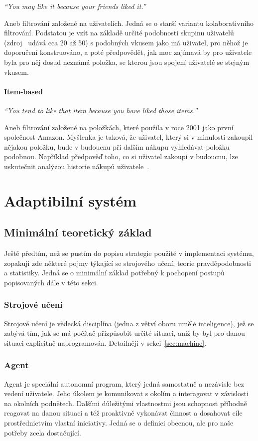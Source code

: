 \documentclass[thesis=M,czech]{FITthesis}[2014/05/07]
\begin{document}
\emph{``You may like it because your friends liked it.''}~\cite{cf}

Aneb filtrování založené na uživatelích. Jedná se o starší variantu kolaborativního filtrování. Podstatou je vzít na základě určité podobnosti skupinu uživatelů (zdroj~\cite{cf} udává cca 20 až 50) s podobných vkusem jako má uživatel, pro něhož je doporučení konstruováno, a poté předpovědět, jak moc zajímavá by pro uživatele byla pro něj dosud neznámá položka, se kterou jsou spojení uživatelé se stejným vkusem.

\subsubsection{Item-based}

\emph{``You tend to like that item because you have liked those items.''}~\cite{cf}

Aneb filtrování založené na položkách, které použila v roce 2001 jako první společnost Amazon. Myšlenka je taková, že uživatel, který si v minulosti zakoupil nějakou položku, bude v budoucnu při dalším nákupu vyhledávat položku podobnou. Například předpověď toho, co si uživatel zakoupí v budoucnu, lze uskutečnit analýzou historie nákupů uživatele~\cite{itemcf}. 

\chapter{Adaptibilní systém}
\label{chap:adapt}

\section{Minimální teoretický základ}

Ještě předtím, než se pustím do popisu strategie použité v implementaci systému, zopakuji zde některé pojmy týkající se strojového učení, teorie pravděpodobnosti a statistiky. Jedná se o minimální základ potřebný k pochopení postupů popisovaných dále v této sekci. 

\subsection{Strojové učení}
Strojové učení je vědecká disciplína (jedna z větví oboru umělé inteligence), jež se zabývá tím, jak se má počítač přizpůsobit určité situaci, aniž by byl pro danou situaci explicitně naprogramován. Detailněji v sekci~\ref{sec:machine}.

\subsection{Agent}
\label{agent}
Agent je speciální autonomní program, který jedná samostatně a nezávisle bez vedení uživatele. Jeho úkolem je komunikovat s okolím a interagovat v závislosti na okolních podnětech. Dalšími důležitými vlastnostmi jsou schopnost příhodně reagovat na danou situaci a též proaktivně vykonávat činnost a dosahovat cíle prostřednictvím vlastní iniciativy. Jedná se o definici obecnou, ale pro naše potřeby zcela dostačující.
\end{document}
